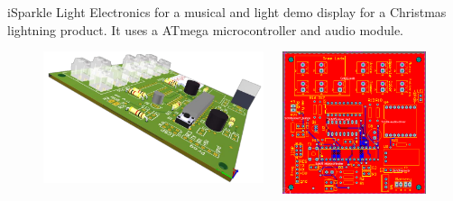 \documentclass[aspectratio=169]{beamer}
\begin{document}
\begin{frame}{iSparkle Light}
  Electronics for a musical and light demo display for a Christmas lightning
  product. It uses a ATmega microcontroller and audio module.
  \begin{figure}[H]
    \centering
    \begin{columns}[T]
      \begin{column}{.5\linewidth}
        \includegraphics[width=\linewidth]{images/isparkle1}
      \end{column}
      \begin{column}{.3\linewidth}
        \includegraphics[width=\linewidth]{images/isparkle2}
      \end{column}
    \end{columns}
  \end{figure}
\end{frame}
\end{document}

